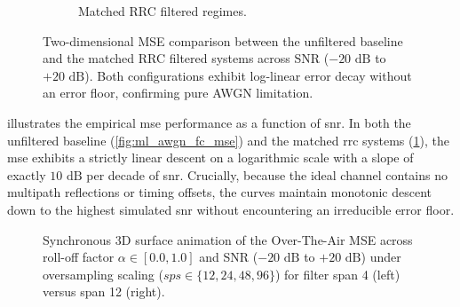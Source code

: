 \documentclass[Markos_Delaportas_1316.tex]{subfiles}
\begin{document}
\begin{figure}[htbp]
\begin{subfigure}{.48\linewidth}
        \caption{Matched RRC filtered regimes.}
        \label{fig:ml_rrc_fc_mse_comparison}
    \end{subfigure}

    \caption{Two-dimensional MSE comparison between the unfiltered
        baseline and the matched RRC filtered systems across SNR
        ($-20\text{ dB}$ to $+20\text{ dB}$). Both configurations exhibit
        log-linear error decay without an error floor, confirming pure
    AWGN limitation.}
    \label{fig:mse_awgn_rrc_comparison}
\end{figure}

 illustrates the empirical
\gls{mse} performance as a function of \gls{snr}. In both the
unfiltered baseline (\cref{fig:ml_awgn_fc_mse}) and the matched
\gls{rrc} systems (\cref{fig:ml_rrc_fc_mse_comparison}), the
\gls{mse} exhibits a strictly linear descent on a logarithmic scale
with a slope of exactly $10\text{ dB}$ per decade of \gls{snr}.
Crucially, because the ideal channel contains no multipath
reflections or timing offsets, the curves maintain monotonic descent
down to the highest simulated \gls{snr} without encountering an
irreducible error floor.

\begin{figure}[htbp]
    \centering
    \caption{
        Synchronous 3D surface animation of the Over-The-Air MSE
        across roll-off factor $\alpha \in [0.0, 1.0]$ and SNR
        ($-20\text{ dB}$ to $+20\text{ dB}$) under oversampling
        scaling ($sps \in \{12, 24, 48, 96\}$) for filter span 4
        (left) versus span 12 (right).
    }
    \label{fig:mse_span_comparison}
\end{figure}
\end{document}
